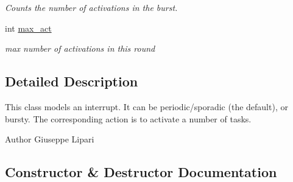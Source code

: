 \begin{DoxyCompactItemize}
\begin{DoxyCompactList}\small\item\em Counts the number of activations in the burst. \end{DoxyCompactList}\item 
int \hyperlink{classRTSim_1_1Interrupt_a4fc806d335622fe71698eb403d8f6cae}{max\+\_\+act}\hypertarget{classRTSim_1_1Interrupt_a4fc806d335622fe71698eb403d8f6cae}{}\label{classRTSim_1_1Interrupt_a4fc806d335622fe71698eb403d8f6cae}

\begin{DoxyCompactList}\small\item\em max number of activations in this round \end{DoxyCompactList}\end{DoxyCompactItemize}


\subsection{Detailed Description}
This class models an interrupt. It can be periodic/sporadic (the default), or bursty. The corresponding action is to activate a number of tasks.

\begin{DoxyAuthor}{Author}
Giuseppe Lipari 
\end{DoxyAuthor}


\subsection{Constructor \& Destructor Documentation}
